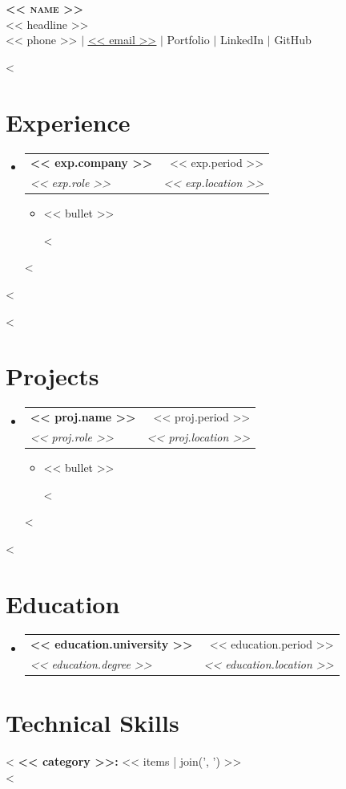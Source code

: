 \documentclass[letterpaper,11pt]{article}
\makeatletter
\newcommand{\resumeItem}[1]{
  \item\small{{#1}}
}
\newcommand{\resumeSubheading}[4]{
  \vspace{-1pt}\item
    \begin{tabular*}{0.97\textwidth}[t]{l@{\extracolsep{\fill}}r}
      \textbf{#1} & #2 \\
      \textit{\small#3} & \textit{\small #4} \\
    \end{tabular*}\vspace{0pt}
}
\newcommand{\resumeSubHeadingListStart}{\begin{itemize}[leftmargin=0.15in,label={}]}
\newcommand{\resumeSubHeadingListEnd}{\end{itemize}}
\newcommand{\resumeItemListStart}{\begin{itemize}[leftmargin=0.25in,topsep=1pt,itemsep=2pt,parsep=0pt,partopsep=0pt]}
\newcommand{\resumeItemListEnd}{\end{itemize}\vspace{-2pt}}
\makeatother
\begin{document}
\begin{center}
    \textbf{\Huge \scshape << name >>} \\ \vspace{1pt}
    \small << headline >> \\ \vspace{2pt}
    \small
    << phone >> $|$
    \href{mailto:<< email >>}{\underline{<< email >>}} $|$
    Portfolio $|$
    LinkedIn $|$
    GitHub
\end{center}

<%
\section{Experience}
\resumeSubHeadingListStart

<%
\resumeSubheading
{<< exp.company >>}{<< exp.period >>}
{<< exp.role >>}{<< exp.location >>}
\resumeItemListStart
<%
\resumeItem{<< bullet >>}
<%
\resumeItemListEnd
<%

\resumeSubHeadingListEnd
<%

<%
\section{Projects}
\resumeSubHeadingListStart

<%
\resumeSubheading
{<< proj.name >>}{<< proj.period >>}
{<< proj.role >>}{<< proj.location >>}
\resumeItemListStart
<%
\resumeItem{<< bullet >>}
<%
\resumeItemListEnd
<%

\resumeSubHeadingListEnd
<%

\section{Education}
\resumeSubHeadingListStart
\resumeSubheading
{<< education.university >>}{<< education.period >>}
{<< education.degree >>}{<< education.location >>}
\resumeSubHeadingListEnd

\section{Technical Skills}
\begin{itemize}[leftmargin=0.15in,label={}]
\small{
\item{
<%
\textbf{<< category >>:} << items | join(', ') >> \\
<%
}}
\end{itemize}
\end{document}
